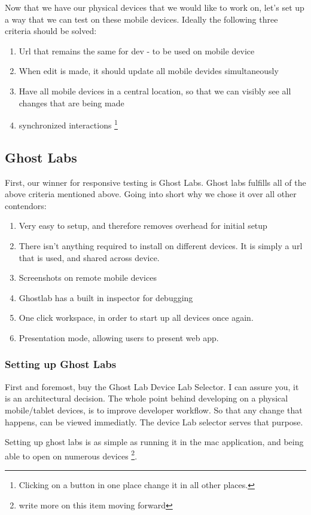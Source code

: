 Now that we have our physical devices that we would like to work on, let's set
up a way that we can test on these mobile devices. Ideally the following three
criteria should be solved:
\begin{enumerate}
  \item Url that remains the same for dev - to be used on mobile device
  \item When edit is made, it should update all mobile devides simultaneously
  \item Have all mobile devices in a central location, so that we can visibly
  see all changes that are being made
  \item synchronized interactions \footnote{Clicking on a button in one place
  change it in all other places.}
\end{enumerate}

\subsection{ Ghost Labs }

First, our winner for responsive testing is Ghost Labs. Ghost labs fulfills all
of the above criteria mentioned above. Going into short why we chose it over
all other contendors:
\begin{enumerate}
  \item Very easy to setup, and therefore removes overhead for initial setup
  \item There isn't anything required to install on different devices. It is
  simply a url that is used, and shared across device.
  \item Screenshots on remote mobile devices
  \item Ghostlab has a built in inspector for debugging
  \item One click workspace, in order to start up all devices once again.
  \item Presentation mode, allowing users to present web app.
\end{enumerate}

\subsubsection{ Setting up Ghost Labs }
First and foremost, buy the Ghost Lab Device Lab Selector. I can assure you, it
is an architectural decision. The whole point behind developing on a physical
mobile/tablet devices, is to improve developer workflow. So that any change that
happens, can be viewed immediatly. The device Lab selector serves that purpose.

Setting up ghost labs is as simple as running it in the mac application, and
being able to open on numerous devices \footnote{write more on this item moving
forward}.
